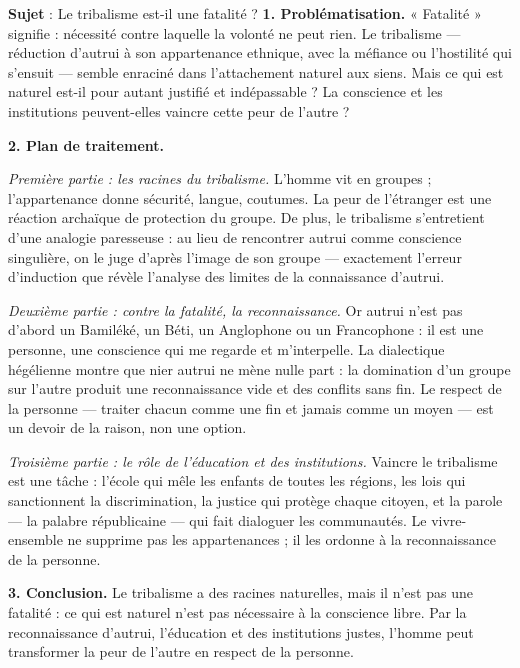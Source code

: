 \documentclass[11pt]{article}
\begin{document}
\begin{exoresolu}
\textbf{Sujet} : Le tribalisme est-il une fatalité ?
\tcblower
\textbf{1. Problématisation.} « Fatalité » signifie : nécessité contre laquelle la volonté ne peut rien. Le tribalisme — réduction d'autrui à son appartenance ethnique, avec la méfiance ou l'hostilité qui s'ensuit — semble enraciné dans l'attachement naturel aux siens. Mais ce qui est naturel est-il pour autant justifié et indépassable ? La conscience et les institutions peuvent-elles vaincre cette peur de l'autre ?

\textbf{2. Plan de traitement.}

\emph{Première partie : les racines du tribalisme.} L'homme vit en groupes ; l'appartenance donne sécurité, langue, coutumes. La peur de l'étranger est une réaction archaïque de protection du groupe. De plus, le tribalisme s'entretient d'une analogie paresseuse : au lieu de rencontrer autrui comme conscience singulière, on le juge d'après l'image de son groupe — exactement l'erreur d'induction que révèle l'analyse des limites de la connaissance d'autrui.

\emph{Deuxième partie : contre la fatalité, la reconnaissance.} Or autrui n'est pas d'abord un Bamiléké, un Béti, un Anglophone ou un Francophone : il est une personne, une conscience qui me regarde et m'interpelle. La dialectique hégélienne montre que nier autrui ne mène nulle part : la domination d'un groupe sur l'autre produit une reconnaissance vide et des conflits sans fin. Le respect de la personne — traiter chacun comme une fin et jamais comme un moyen — est un devoir de la raison, non une option.

\emph{Troisième partie : le rôle de l'éducation et des institutions.} Vaincre le tribalisme est une tâche : l'école qui mêle les enfants de toutes les régions, les lois qui sanctionnent la discrimination, la justice qui protège chaque citoyen, et la parole — la palabre républicaine — qui fait dialoguer les communautés. Le vivre-ensemble ne supprime pas les appartenances ; il les ordonne à la reconnaissance de la personne.

\textbf{3. Conclusion.} Le tribalisme a des racines naturelles, mais il n'est pas une fatalité : ce qui est naturel n'est pas nécessaire à la conscience libre. Par la reconnaissance d'autrui, l'éducation et des institutions justes, l'homme peut transformer la peur de l'autre en respect de la personne.
\end{exoresolu}
\end{document}
